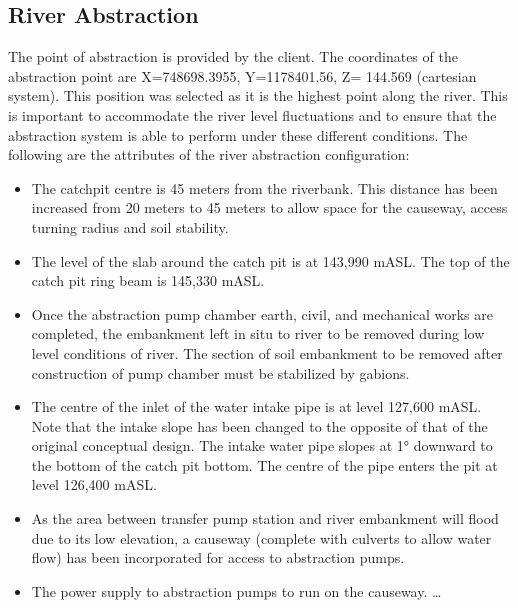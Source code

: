 \documentclass{article}%
\begin{document}
\subsection{River Abstraction}%
\label{subsec:RiverAbstraction}%
The point of abstraction is provided by the client. The coordinates of the abstraction point are X=748698.3955, Y=1178401.56, Z= 144.569 (cartesian system). This position was selected as it is the highest point along the river. This is important to accommodate the river level fluctuations and to ensure that the abstraction system is able to perform under these different conditions.%
\newline%
%
\newline%
%
 The following are the attributes of the river abstraction configuration:%
\begin{itemize}%
\item%
The catchpit centre is 45 meters from the riverbank. This distance has been increased from 20 meters to 45 meters to allow space for the causeway, access turning radius and soil stability.%
\item%
The level of the slab around the catch pit is at 143,990 mASL. The top of the catch pit ring beam is 145,330 mASL.%
\item%
Once the abstraction pump chamber earth, civil, and mechanical works are completed, the embankment left in situ to river to be removed during low level conditions of river. The section of soil embankment to be removed after construction of pump chamber must be stabilized by gabions.%
\item%
The centre of the inlet of the water intake pipe is at level 127,600 mASL. Note that the intake slope has been changed to the opposite of that of the original conceptual design. The intake water pipe slopes at 1° downward to the bottom of the catch pit bottom. The centre of the pipe enters the pit at level 126,400 mASL.%
\item%
As the area between transfer pump station and river embankment will flood due to its low elevation, a causeway (complete with culverts to allow water flow) has been incorporated for access to abstraction pumps.%
\item%
The power supply to abstraction pumps to run on the causeway.%
\ldots%
\end{itemize}

%
\end{document}
